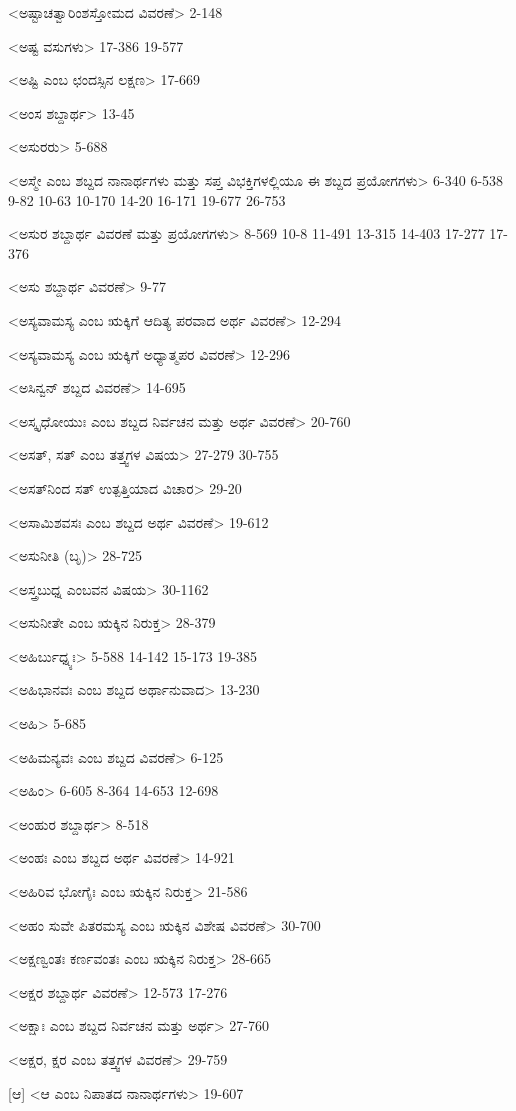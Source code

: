<ಅಷ್ಟಾಚತ್ವಾರಿಂಶಸ್ತೋಮದ ವಿವರಣೆ>
2-148

<ಅಷ್ಟ ವಸುಗಳು>
17-386
19-577

<ಅಷ್ಟಿ ಎಂಬ ಛಂದಸ್ಸಿನ ಲಕ್ಷಣ>
17-669

<ಅಂಸ ಶಬ್ದಾರ್ಥ>
13-45

<ಅಸುರರು>
5-688

<ಅಸ್ಮೇ ಎಂಬ ಶಬ್ದದ ನಾನಾರ್ಥಗಳು ಮತ್ತು ಸಪ್ತ ವಿಭಕ್ತಿಗಳಲ್ಲಿಯೂ ಈ ಶಬ್ದದ ಪ್ರಯೋಗಗಳು>
6-340
6-538 
9-82 
10-63 
10-170 
14-20 
16-171 
19-677
26-753

<ಅಸುರ ಶಬ್ದಾರ್ಥ ವಿವರಣೆ ಮತ್ತು ಪ್ರಯೋಗಗಳು>
8-569 
10-8 
11-491
13-315
14-403 
17-277
17-376

<ಅಸು ಶಬ್ದಾರ್ಥ ವಿವರಣೆ>
9-77

<ಅಸ್ಯವಾಮಸ್ಯ ಎಂಬ ಋಕ್ಕಿಗೆ ಆದಿತ್ಯ ಪರವಾದ ಅರ್ಥ ವಿವರಣೆ>
12-294

<ಅಸ್ಯವಾಮಸ್ಯ ಎಂಬ ಋಕ್ಕಿಗೆ ಅಧ್ಯಾತ್ಮಪರ ವಿವರಣೆ>
12-296

<ಅಸಿನ್ವನ್‍ ಶಬ್ದದ ವಿವರಣೆ>
14-695

<ಅಸ್ಕೃಧೋಯುಃ ಎಂಬ ಶಬ್ದದ ನಿರ್ವಚನ ಮತ್ತು ಅರ್ಥ ವಿವರಣೆ>
20-760

<ಅಸತ್‍, ಸತ್‍ ಎಂಬ ತತ್ತ್ವಗಳ ವಿಷಯ>
27-279
30-755

<ಅಸತ್‍ನಿಂದ ಸತ್‍ ಉತ್ಪತ್ತಿಯಾದ ವಿಚಾರ>
29-20

<ಅಸಾಮಿಶವಸಃ ಎಂಬ ಶಬ್ದದ ಅರ್ಥ ವಿವರಣೆ>
19-612

<ಅಸುನೀತಿ (ಬೃ)>
28-725

<ಅಸ್ತ್ರಬುಧ್ನ ಎಂಬವನ ವಿಷಯ>
30-1162

<ಅಸುನೀತೇ ಎಂಬ ಋಕ್ಕಿನ ನಿರುಕ್ತ>
28-379

<ಅಹಿರ್ಬುಧ್ನ್ಯಃ>
5-588 
14-142 
15-173
19-385

<ಅಹಿಭಾನವಃ ಎಂಬ ಶಬ್ದದ ಅರ್ಥಾನುವಾದ>
13-230

<ಅಹಿ>
5-685

<ಅಹಿಮನ್ಯವಃ ಎಂಬ ಶಬ್ದದ ವಿವರಣೆ>
6-125

<ಅಹಿಂ>
6-605 
8-364 
14-653
12-698

<ಅಂಹುರ ಶಬ್ದಾರ್ಥ>
8-518

<ಅಂಹಃ ಎಂಬ ಶಬ್ದದ ಅರ್ಥ ವಿವರಣೆ>
14-921

<ಅಹಿರಿವ ಭೋಗೈಃ ಎಂಬ ಋಕ್ಕಿನ ನಿರುಕ್ತ>
21-586

<ಅಹಂ ಸುವೇ ಪಿತರಮಸ್ಯ ಎಂಬ ಋಕ್ಕಿನ ವಿಶೇಷ ವಿವರಣೆ>
30-700

<ಅಕ್ಷಣ್ವಂತಃ ಕರ್ಣವಂತಃ ಎಂಬ ಋಕ್ಕಿನ ನಿರುಕ್ತ>
28-665

<ಅಕ್ಷರ ಶಬ್ದಾರ್ಥ ವಿವರಣೆ>
12-573
17-276

<ಅಕ್ಷಾಃ ಎಂಬ ಶಬ್ದದ ನಿರ್ವಚನ ಮತ್ತು ಅರ್ಥ>
27-760

<ಅಕ್ಷರ, ಕ್ಷರ ಎಂಬ ತತ್ತ್ವಗಳ ವಿವರಣೆ>
29-759

[ಆ]
<ಆ ಎಂಬ ನಿಪಾತದ ನಾನಾರ್ಥಗಳು>
19-607

